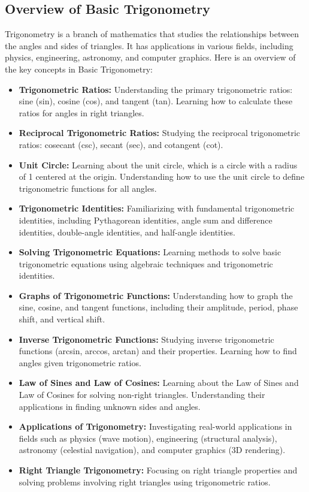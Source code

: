 \documentclass[openany]{book}
\begin{document}
\subsection{Overview of Basic Trigonometry}
Trigonometry is a branch of mathematics that studies the relationships between the angles and sides of triangles. It has applications in various fields, including physics, engineering, astronomy, and computer graphics. Here is an overview of the key concepts in Basic Trigonometry:
\begin{itemize}
    \item \textbf{Trigonometric Ratios:} Understanding the primary trigonometric ratios: sine (sin), cosine (cos), and tangent (tan). Learning how to calculate these ratios for angles in right triangles.
    \item \textbf{Reciprocal Trigonometric Ratios:} Studying the reciprocal trigonometric ratios: cosecant (csc), secant (sec), and cotangent (cot).
    \item \textbf{Unit Circle:} Learning about the unit circle, which is a circle with a radius of 1 centered at the origin. Understanding how to use the unit circle to define trigonometric functions for all angles.
    \item \textbf{Trigonometric Identities:} Familiarizing with fundamental trigonometric identities, including Pythagorean identities, angle sum and difference identities, double-angle identities, and half-angle identities.
    \item \textbf{Solving Trigonometric Equations:} Learning methods to solve basic trigonometric equations using algebraic techniques and trigonometric identities.
    \item \textbf{Graphs of Trigonometric Functions:} Understanding how to graph the sine, cosine, and tangent functions, including their amplitude, period, phase shift, and vertical shift.
    \item \textbf{Inverse Trigonometric Functions:} Studying inverse trigonometric functions (arcsin, arccos, arctan) and their properties. Learning how to find angles given trigonometric ratios.
    \item \textbf{Law of Sines and Law of Cosines:} Learning about the Law of Sines and Law of Cosines for solving non-right triangles. Understanding their applications in finding unknown sides and angles.
    \item \textbf{Applications of Trigonometry:} Investigating real-world applications in fields such as physics (wave motion), engineering (structural analysis), astronomy (celestial navigation), and computer graphics (3D rendering).
    \item \textbf{Right Triangle Trigonometry:} Focusing on right triangle properties and solving problems involving right triangles using trigonometric ratios.
\end{itemize}
\end{document}
